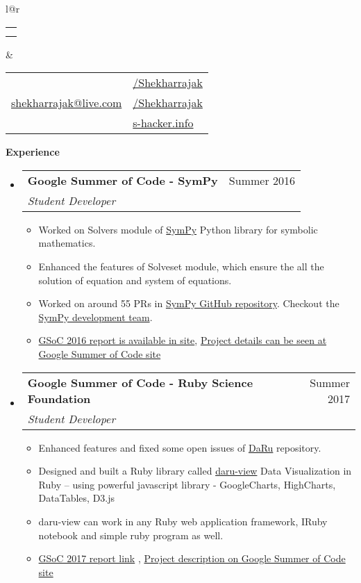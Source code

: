 \documentclass[letterpaper,12pt]{article}[leftmargin=*]
\makeatletter
\def \fullname {Shekhar Prasad Rajak}
\def \subtitle {}
\def \linkedinicon {\faLinkedin}
\def \linkedinlink {https://www.linkedin.com/in/shekhar-prasad-rajak-9988b626/}
\def \linkedintext {/Shekharrajak}
\def \phoneicon {\faPhone}
\def \phonetext {+91-8142478937}
\def \emailicon {\faEnvelope}
\def \emaillink {mailto:shekharrajak@live.com}
\def \emailtext {shekharrajak@live.com}
\def \githubicon {\faGithub}
\def \githublink {https://github.com/Shekharrajak}
\def \githubtext {/Shekharrajak}
\def \websiteicon {\faGlobe}
\def \websitelink {http://s-hacker.info/}
\def \websitetext {s-hacker.info}
\def \headertype {\doublecol} %
\def \entryspacing {-0pt}
\def \linkedin {\linkedinicon \hspace{3pt}\href{\linkedinlink}{\linkedintext}}
\def \phone {\phoneicon \hspace{3pt}{ \phonetext}}
\def \email {\emailicon \hspace{3pt}\href{\emaillink}{\emailtext}}
\def \github {\githubicon \hspace{3pt}\href{\githublink}{\githubtext}}
\def \website {\websiteicon \hspace{3pt}\href{\websitelink}{\websitetext}}
\renewcommand{\section}[2]{\vspace{5pt}
  \colorbox{secondary}{\color{white}\raggedbottom\normalsize\textbf{{#1}{\hspace{7pt}#2}}}
}
\newcommand{\resumeEntryStart}{\begin{itemize}[leftmargin=2.5mm]}
\newcommand{\resumeEntryEnd}{\end{itemize}\vspace{\entryspacing}}
\newcommand{\resumeItemListStart}{\begin{itemize}[leftmargin=4.5mm]}
\newcommand{\resumeItemListEnd}{\end{itemize}}
\newcommand{\resumeItem}[1]{
  \item\small{
    {#1 \vspace{-2pt}}
  }
}
\newcommand{\resumeEntryTSDL}[4]{
  \vspace{-1pt}\item[]
    \begin{tabular*}{0.97\textwidth}{l@{\extracolsep{\fill}}r}
      \textbf{\color{primary}#1} & {\firabook\color{accent}\small#2} \\
      \textit{\color{accent}\small#3} & \textit{\color{accent}\small#4} \\
    \end{tabular*}\vspace{-6pt}
}
\newcommand{\doublecol}[6]{
  \begin{tabular*}{\textwidth}{l@{\extracolsep{\fill}}r}
    {
      \begin{tabular}[c]{l}
        \fontsize{25}{25}\selectfont{\color{primary}{{\textbf{\fullname}}}} \\
        {\textit{\subtitle}} %
      \end{tabular}
    } & {
      \begin{tabular}[c]{l@{\hspace{1.5em}}l}
        {\small#4} & {\small#1} \\
        {\small#5} & {\small#2} \\
        {\small#6} & {\small#3}
      \end{tabular}
    }
  \end{tabular*}
}
\newcommand{\singlecol}[6]{
  \begin{tabular*}{\textwidth}{l@{\extracolsep{\fill}}r}
    {
      \begin{tabular}[b]{l}
        \fontsize{35}{45}\selectfont{\color{primary}{{\textbf{\fullname}}}} \\
        {\textit{\subtitle}} %
      \end{tabular}
    } & {
      \begin{tabular}[c]{l}
        {\small#1} \\
        {\small#2} \\
        {\small#3} \\
        {\small#4} \\
        {\small#5} \\
        {\small#6}
      \end{tabular}
    }
  \end{tabular*}
}
\makeatother
\begin{document}


\headertype{\linkedin}{\github}{\website}{\phone}{\email}{} %
\vspace{-10pt} %



\section{\faPieChart}{Experience}

  \resumeEntryStart
    \resumeEntryTSDL
      {Google Summer of Code - SymPy}{Summer 2016}
      {Student Developer}{}
    \resumeItemListStart
      \resumeItem {Worked on Solvers module of \href{https://github.com/sympy/sympy}{SymPy}  Python library for symbolic mathematics.}
      \resumeItem {Enhanced the features of Solveset module, which ensure the all the solution of equation and system of equations.}
      \resumeItem {Worked on around 55 PRs in \href{https://github.com/sympy/sympy/pulls/Shekharrajak}{SymPy GitHub repository}. Checkout the \href{https://docs.sympy.org/latest/aboutus.html#sympy-development-team}{SymPy development team}.}
      \resumeItem {\href{https://shekharrajak.github.io/gsoc_2016_posts/}{GSoC 2016 report is available in site}, \href{https://summerofcode.withgoogle.com/archive/2016/projects/6728916672708608/}{Project details can be seen at Google Summer of Code site}}
    \resumeItemListEnd
  \resumeEntryEnd

  \resumeEntryStart
    \resumeEntryTSDL
      {Google Summer of Code - Ruby Science Foundation}{Summer 2017}
      {Student Developer}{}
    \resumeItemListStart
        \resumeItem {Enhanced features and fixed some open issues of \href{https://github.com/SciRuby/daru/}{DaRu} repository.}
        \resumeItem {Designed and built a Ruby library called \href{https://github.com/SciRuby/daru-view/}{daru-view} Data Visualization
in Ruby -- using powerful javascript library - GoogleCharts, HighCharts,
DataTables, D3.js}
        \resumeItem {daru-view can work in any Ruby web application framework, IRuby notebook and simple ruby program as well.}
        \resumeItem {\href{https://shekharrajak.github.io/gsoc_2017_posts/}{GSoC 2017 report link}},
        \href{https://summerofcode.withgoogle.com/archive/2017/projects/5267803426783232/}{Project description on Google Summer of Code site}
    \resumeItemListEnd
  \resumeEntryEnd
\end{document}
